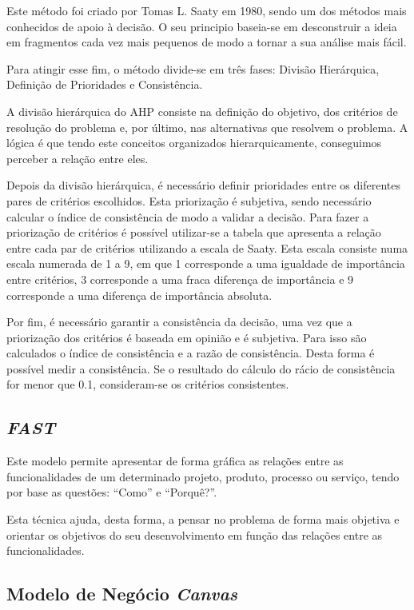 Este método foi criado por Tomas L. Saaty em 1980, sendo um dos métodos mais conhecidos de apoio à decisão. O seu principio baseia-se em desconstruir a ideia em fragmentos cada vez mais pequenos de modo a tornar a sua análise mais fácil.

Para atingir esse fim, o método divide-se em três fases: Divisão Hierárquica, Definição de Prioridades e Consistência\cite{ahp}.

A divisão hierárquica do \acrshort{AHP} consiste na definição do objetivo, dos critérios de resolução do problema e, por último, nas alternativas que resolvem o problema. A lógica é que tendo este conceitos organizados hierarquicamente, conseguimos perceber a relação entre eles.

Depois da divisão hierárquica, é necessário definir prioridades entre os diferentes pares de critérios escolhidos. Esta priorização é subjetiva, sendo necessário calcular o índice de consistência de modo a validar a decisão. Para fazer a priorização de critérios é possível utilizar-se a tabela que apresenta a relação entre cada par de critérios utilizando a escala de Saaty. Esta escala consiste numa escala numerada de 1 a 9, em que 1 corresponde a uma igualdade de importância entre critérios, 3 corresponde a uma fraca diferença de importância e 9 corresponde a uma diferença de importância absoluta.

Por fim, é necessário garantir a consistência da decisão, uma vez que a priorização dos critérios é baseada em opinião e é subjetiva. Para isso são calculados o índice de consistência e a razão de consistência. Desta forma é possível medir a consistência. Se o resultado do cálculo do rácio de consistência for menor que 0.1, consideram-se os critérios consistentes.

\subsection{\emph{\acrfull{FAST}}}

Este modelo permite apresentar de forma gráfica as relações entre as funcionalidades de um determinado projeto, produto, processo ou serviço, tendo por base as questões: “Como” e “Porquê?”\cite{fast}.

Esta técnica ajuda, desta forma, a pensar no problema de forma mais objetiva e orientar os objetivos do seu desenvolvimento em função das relações entre as funcionalidades\cite{fast}.


\subsection{Modelo de Negócio \emph{Canvas}}

